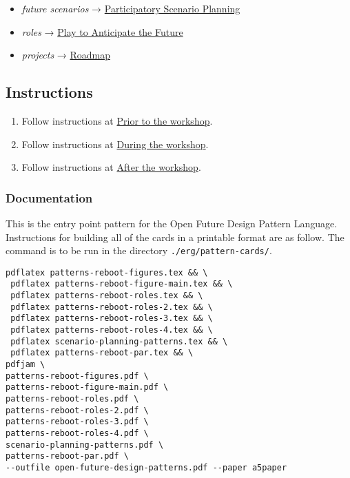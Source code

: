 \documentclass[11pt]{article}
\begin{document}
\begin{itemize}
\item \emph{future scenarios} →  \hyperref[95072d03-1359-4863-bad1-651191eb2f38]{Participatory Scenario Planning}
\end{itemize}

\begin{itemize}
\item \emph{roles} →  \hyperref[85fefbc1-ca57-46fa-a8b2-154821a56c75]{Play to Anticipate the Future}
\end{itemize}

\begin{itemize}
\item \emph{projects} →  \hyperref[92e18906-d0e6-4e73-a9cf-fbdad931f3cf]{Roadmap}
\end{itemize}

\subsection{Instructions}
\label{sec:orgd8eabf1}

\begin{enumerate}
\item Follow instructions at \hyperref[9accd402-6d28-4ee2-ac35-44b4fe682d53]{Prior to the workshop}.
\item Follow instructions at \hyperref[c8823bc4-d08e-4486-9841-c914bba9977e]{During the workshop}.
\item Follow instructions at \hyperref[3d0acf49-0c87-4aaa-94b3-84e5d926d58d]{After the workshop}.
\end{enumerate}

\subsubsection{Documentation}
\label{sec:org4bcc1f6}

This is the entry point pattern for the Open Future Design Pattern
Language.  Instructions for building all of the cards in a printable
format are as follow.  The command is to be run in the directory
\texttt{./erg/pattern-cards/}.

\begin{verbatim}
pdflatex patterns-reboot-figures.tex && \
 pdflatex patterns-reboot-figure-main.tex && \
 pdflatex patterns-reboot-roles.tex && \
 pdflatex patterns-reboot-roles-2.tex && \
 pdflatex patterns-reboot-roles-3.tex && \
 pdflatex patterns-reboot-roles-4.tex && \
 pdflatex scenario-planning-patterns.tex && \
 pdflatex patterns-reboot-par.tex && \
pdfjam \
patterns-reboot-figures.pdf \
patterns-reboot-figure-main.pdf \
patterns-reboot-roles.pdf \
patterns-reboot-roles-2.pdf \
patterns-reboot-roles-3.pdf \
patterns-reboot-roles-4.pdf \
scenario-planning-patterns.pdf \
patterns-reboot-par.pdf \
--outfile open-future-design-patterns.pdf --paper a5paper
\end{verbatim}
\end{document}
